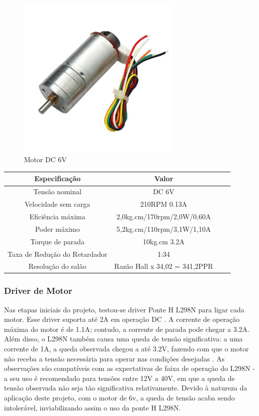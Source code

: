 \begin{figure}[htb]
	\centering
	\includegraphics[width=0.7\textwidth]{figures/CHR_GM25_370}
	\caption{Motor DC 6V \cite{motor_dc_6v_encoder}}
\end{figure}

\begin{quadro}[htb]
\caption{\label{Especificacoes_motordc_6v}Especificações do motor DC 6V}
	 \begin{tabular}{|c|c|c|c|}
		\hline
		\textbf{Especificação} & \textbf{Valor} \\ \hline
		Tensão nominal & DC 6V  \\ \hline
		Velocidade sem carga  & 210RPM 0.13A  \\ \hline
		Eficiência máxima & 2,0kg.cm/170rpm/2,0W/0,60A   \\ \hline
		Poder máximo & 5,2kg.cm/110rpm/3,1W/1,10A   \\ \hline
		Torque de parada  & 10kg.cm 3.2A    \\ \hline
		Taxa de Redução do Retardador & 1:34  \\ \hline
		Resolução do salão & Razão Hall x 34,02 = 341,2PPR  \\ \hline
	\end{tabular}
\end{quadro}


\subsubsection{Driver de Motor}
Nas etapas iniciais do projeto, testou-se driver Ponte H L298N para ligar cada motor. Esse driver suporta até 2A em
operação DC \cite{datasheel_l298n}. A corrente de operação máxima do motor é de 1.1A; contudo, a corrente de parada
pode chegar a 3.2A. Além disso, o L298N também causa uma queda de tensão significativa: a uma corrente de 1A, a queda
observada chegou a até 3.2V, fazendo com que o motor não receba a tensão necessária para operar nas condições
desejadas \cite{datasheel_l298n}. As observações são compatíveis com as expectativas de faixa de operação do L298N - a
seu uso é recomendado para tensões entre 12V a 40V, em que a queda de tensão observada não seja tão significativa
relativamente. Devido à natureza da aplicação deste projeto, com o motor de 6v, a queda de tensão acaba sendo
intolerável, inviabilizando assim o uso da ponte H L298N.

